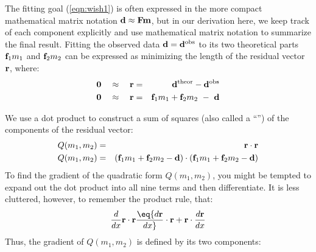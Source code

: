 \par
The fitting goal (\ref{eqn:wish1}) is often expressed in the more compact
mathematical matrix notation ${\bf d}  \approx \bold F   \bold m$,
but in our derivation here,
we keep track of each component explicitly
and use mathematical matrix notation to summarize the final result.
Fitting the observed data $\bold d = \bold d^{\rm obs}$
to its two theoretical parts
          $\bold f_1m_1$ and $\bold f_2m_2$
can be expressed
as minimizing the length of the residual vector $\bold r$, where:
\begin{eqnarray}
        \bold 0 \quad\approx\quad
        \bold r &=&  \bold d^{\rm theor} -  \bold d^{\rm obs}
        \\
        \bold 0 \quad\approx\quad
        \bold r &=&  \bold f_1 m_1 + \bold f_2 m_2  \ -\ {\bf d}
        \label{eqn:resdef}
\end{eqnarray}

We use a dot product to construct a sum of squares (also called a ``'')
of the components of the residual vector:
\begin{eqnarray}
Q(m_1,m_2) &=& \bold r \cdot \bold r \\
Q(m_1,m_2) &=&
                   ({\bf f}_1 m_1 + {\bf f}_2 m_2 - {\bf d} )
           \cdot
                   ({\bf f}_1 m_1 + {\bf f}_2 m_2 - {\bf d} )
\label{eqn:allquadratics}
\end{eqnarray}
To find the gradient of the quadratic form $Q(m_1,m_2)$,
you might be tempted to expand out the dot product into all nine terms
and then differentiate.
It is less cluttered, however, to remember the product rule, that:
\begin{equation}
{d\over dx} \bold r \cdot \bold r
\eq
{d\bold r \over dx} \cdot \bold r
+
\bold r
\cdot
{d\bold r \over dx}
\end{equation}
Thus, the gradient of $ Q(m_1,m_2)$  is defined by its two components:

